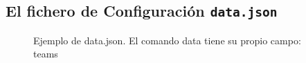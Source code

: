 \subsection{El fichero de Configuración {\tt data.json}} \label{diseño:data}

\begin{figure}[H]
    \centering
    \caption{Ejemplo de data.json. El comando data tiene su propio campo: teams}
    \label{fig:data}
\end{figure}

